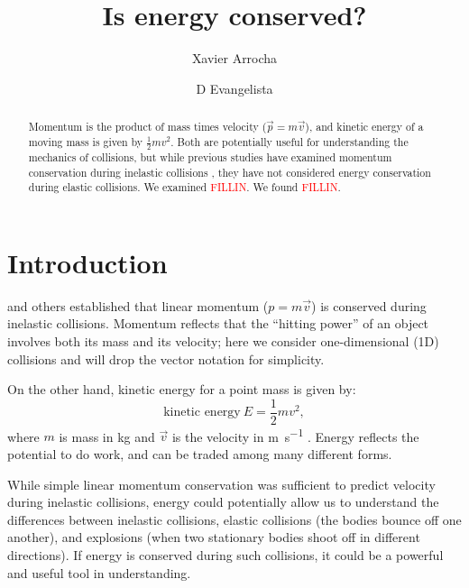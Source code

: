 \documentclass[aps,prl,preprint]{revtex4-1}
\begin{document}
\linenumbers
\title{Is energy conserved?}
\author{Xavier Arrocha}
\author{D Evangelista}

\newcommand{\student}[1]{{\textcolor{red}{#1}}}

\begin{abstract}
Momentum is the product of mass times velocity ($\vec{p}=m\vec{v}$), and kinetic energy of a moving mass is given by $\frac{1}{2}mv^2$. Both are potentially useful for understanding the mechanics of collisions, but while previous studies have examined momentum conservation during inelastic collisions \cite{ortega-2021-momentum}, they have not considered energy conservation during elastic collisions. We examined \student{FILLIN}. We found \student{FILLIN}.\end{abstract}
\maketitle

\section{Introduction}
\cite{ortega-2021-momentum} and others established that linear momentum ($p=m\vec{v}$) is conserved during inelastic collisions. Momentum reflects that the ``hitting power'' of an object involves both its mass and its velocity; here we consider one-dimensional (1D) collisions and will drop the vector notation for simplicity.  

On the other hand, kinetic energy for a point mass is given by:
\begin{equation}
\text{kinetic energy}\ E = \frac{1}{2} m v^2,
\label{eq:energy}
\end{equation}
where $m$ is mass in \si{\kilo\gram} and $\vec{v}$ is the velocity in \si{\meter\per\second} \cite{duchatelet-1741-reponse, coriolis-1829-calcul}. Energy reflects the potential to do work, and can be traded among many different forms. 

While simple linear momentum conservation was sufficient to predict velocity during inelastic collisions, energy could potentially allow us to understand the differences between  inelastic collisions, elastic collisions (the bodies bounce off one another), and explosions (when two stationary bodies shoot off in different directions). If energy is conserved during such collisions, it could be a powerful and useful tool in understanding.
\end{document}
